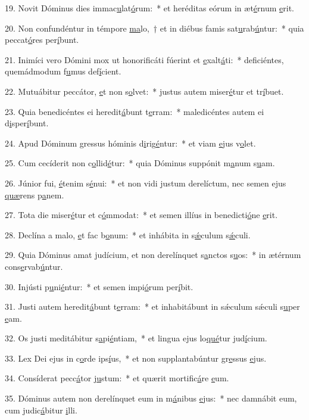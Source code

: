 19. Novit Dóminus dies immac\uline{u}lat\uline{ó}rum:~* et heréditas eórum in æt\uline{é}rnum \uline{e}rit.\par 
20. Non confundéntur in témpore \uline{ma}lo,~† et in diébus famis sat\uline{u}rab\uline{ú}ntur:~* quia peccat\uline{ó}res per\uline{í}bunt.\par 
21. Inimíci vero Dómini mox ut honorificáti fúerint et \uline{e}xalt\uline{á}ti:~* deficiéntes, quemádmodum f\uline{u}mus def\uline{í}cient.\par 
22. Mutuábitur peccátor, \uline{e}t non s\uline{o}lvet:~* justus autem miser\uline{é}tur et tr\uline{í}buet.\par 
23. Quia benedicéntes ei heredit\uline{á}bunt t\uline{e}rram:~* maledicéntes autem ei d\uline{i}sper\uline{í}bunt.\par 
24. Apud Dóminum gressus hóminis d\uline{i}rig\uline{é}ntur:~* et viam \uline{e}jus v\uline{o}let.\par 
25. Cum cecíderit non c\uline{o}llid\uline{é}tur:~* quia Dóminus suppónit m\uline{a}num s\uline{u}am.\par 
26. Júnior fui, \uline{é}tenim s\uline{é}nui:~* et non vidi justum derelíctum, nec semen ejus \uline{quæ}rens p\uline{a}nem.\par 
27. Tota die miser\uline{é}tur et c\uline{ó}mmodat:~* et semen illíus in benedicti\uline{ó}ne \uline{e}rit.\par 
28. Declína a malo, \uline{e}t fac b\uline{o}num:~* et inhábita in s\uline{ǽ}culum s\uline{ǽ}culi.\par 
29. Quia Dóminus amat judícium, et non derelínquet s\uline{a}nctos s\uline{u}os:~* in ætérnum cons\uline{e}rvab\uline{ú}ntur.\par 
30. Injústi p\uline{u}ni\uline{é}ntur:~* et semen impi\uline{ó}rum per\uline{í}bit.\par 
31. Justi autem heredit\uline{á}bunt t\uline{e}rram:~* et inhabitábunt in sǽculum sǽculi s\uline{u}per \uline{e}am.\par 
32. Os justi meditábitur s\uline{a}pi\uline{é}ntiam,~* et lingua ejus lo\uline{qué}tur jud\uline{í}cium.\par 
33. Lex Dei ejus in c\uline{o}rde ips\uline{í}us,~* et non supplantabúntur gr\uline{e}ssus \uline{e}jus.\par 
34. Consíderat pecc\uline{á}tor j\uline{u}stum:~* et quærit mortific\uline{á}re \uline{e}um.\par 
35. Dóminus autem non derelínquet eum in m\uline{á}nibus \uline{e}jus:~* nec damnábit eum, cum judic\uline{á}bitur \uline{i}lli.\par 
